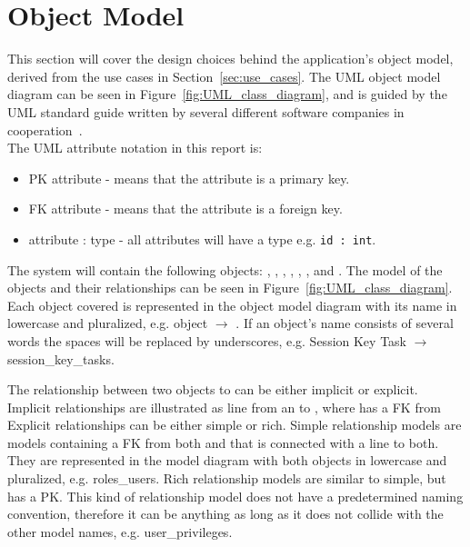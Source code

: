 \section{Object Model}
\label{section:uml_notation}
\label{subsec:objects}

This section will cover the design choices behind the application's object model, derived from the use cases in Section~\ref{sec:use_cases}.
The UML object model diagram can be seen in Figure~\ref{fig:UML_class_diagram}, and is guided by the UML standard guide written by several different software companies in cooperation~\citep{UML_notation}.\\

The UML attribute notation in this report is:
\begin{itemize}
    \item PK attribute - means that the attribute is a primary key.
    \item FK attribute - means that the attribute is a foreign key.
    \item attribute : type - all attributes will have a type e.g. \verb+id : int+.
\end{itemize}

The system will contain the following objects: , , , , , , and .
The model of the objects and their relationships can be seen in Figure~\ref{fig:UML_class_diagram}.
Each object covered is represented in the object model diagram with its name in lowercase and pluralized, e.g.  object $\rightarrow$ .
If an object's name consists of several words the spaces will be replaced by underscores, e.g. Session Key Task $\rightarrow$ session\_key\_tasks.

The relationship between two objects  to  can be either implicit or explicit.
Implicit relationships are illustrated as line from an  to , where  has a FK from 
Explicit relationships can be either simple or rich.
Simple relationship models are models containing a FK from both  and  that is connected with a line to both.
They are represented in the model diagram with both objects in lowercase and pluralized, e.g. roles\_users.
Rich relationship models are similar to simple, but has a PK.
This kind of relationship model does not have a predetermined naming convention, therefore it can be anything as long as it does not collide with the other model names, e.g. user\_privileges.\\

